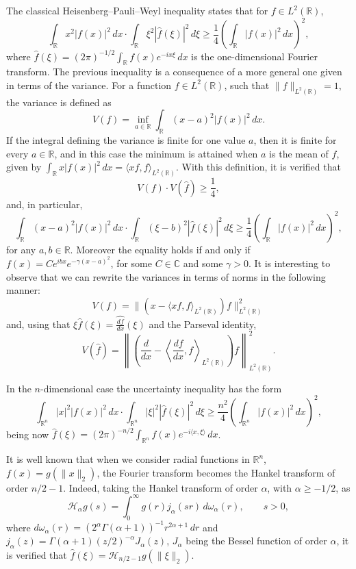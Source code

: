 \documentclass[a4paper]{amsart}
\theoremstyle{plain}
\theoremstyle{definition}
\begin{document}
The classical Heisenberg--Pauli--Weyl inequality states that for $f\in L^2(\mathbb{R})$,
\[
\int_{\mathbb{R}}x^2|f(x)|^2\,dx 
\cdot \int_{\mathbb{R}}\xi^2|\widehat{f}(\xi)|^2\,d\xi
\ge \frac14 \left(\int_{\mathbb{R}}|f(x)|^2\,dx\right)^2,
\]
where $\widehat{f}(\xi)=(2\pi)^{-1/2} \int_{\mathbb{R}}f(x)e^{-i x\xi }\, dx$ is the one-dimensional Fourier transform. The previous inequality is a consequence of a more general one given in terms of the variance. For a function $f\in L^2(\mathbb{R})$, such that $\|f\|_{L^2(\mathbb{R})}=1$, the variance is defined as
\[
V(f)=\inf_{a\in \mathbb{R}}\int_{\mathbb{R}}(x-a)^2|f(x)|^2\,dx.
\]
If the integral defining the variance is finite for one value $a$, then it is finite for every $a\in \mathbb{R}$, and in this case the minimum is attained when $a$ is the mean of $f$, given by $\int_{\mathbb{R}}x|f(x)|^2\,dx=\langle x f,f\rangle_{L^2(\mathbb{R})}$. With this definition, it is verified that
\[
V(f)\cdot V(\widehat{f})\ge \frac14,
\]
and, in particular,
\[
\int_{\mathbb{R}}(x-a)^2|f(x)|^2\,dx
\cdot \int_{\mathbb{R}}(\xi-b)^2|\widehat{f}(\xi)|^2\,d\xi
\ge \frac14 \left(\int_{\mathbb{R}}|f(x)|^2\,dx\right)^2,
\]
for any $a,b\in \mathbb{R}$. Moreover the equality holds if and only if $f(x)=Ce^{ibx}e^{-\gamma(x-a)^2}$, for some $C\in \mathbb{C}$ and some $\gamma>0$. It is interesting to observe that we can rewrite the variances in terms of norms in the following manner:
\[
V(f) = \|(x-\langle x f,f\rangle_{L^2(\mathbb{R})})f\|^2_{L^2(\mathbb{R})}
\]
and, using that $\xi\widehat{f}(\xi)=\widehat{\frac{df}{dx}}(\xi)$ and the Parseval identity,
\[
V(\widehat{f}) = \left\|\left(\frac{d}{dx} - \left\langle\frac{df}{dx},f
\right\rangle_{L^2(\mathbb{R})}\right)f\right\|_{L^2(\mathbb{R})}^2.
\]

In the $n$-dimensional case the uncertainty inequality has the form
\[
\int_{\mathbb{R}^n}|x|^2|f(x)|^2\,dx\cdot \int_{\mathbb{R}^n}|\xi|^2|\widehat{f}(\xi)|^2\,d\xi\ge \frac{n^2}4 \left(\int_{\mathbb{R}^n}|f(x)|^2\,dx\right)^2,
\]
being now $\widehat{f}(\xi) = (2\pi)^{-n/2} 
\int_{\mathbb{R}^n}f(x)e^{-i \langle x,\xi \rangle}\, dx$.


It is well known that when we consider radial functions in $\mathbb{R}^n$, $f(x)=g(\|x\|_2)$, the Fourier transform becomes the Hankel transform of order ${n/2-1}$. Indeed, taking the Hankel transform of order $\alpha$, with $\alpha\ge -1/2$, as
\[
\mathcal{H}_\alpha g(s) = \int_0^\infty g(r)j_\alpha(sr)\, d\omega_{\alpha}(r),\qquad s>0,
\]
where $d\omega_{\alpha}(r) = (2^{\alpha}\Gamma(\alpha+1))^{-1}r^{2\alpha+1}\, dr$ and $j_\alpha(z)=\Gamma(\alpha+1)(z/2)^{-\alpha} J_\alpha(z)$, $J_\alpha$ being the Bessel function of order $\alpha$, it is verified that $\widehat{f}(\xi)=\mathcal{H}_{n/2-1}g(\|\xi\|_2)$.
\end{document}
